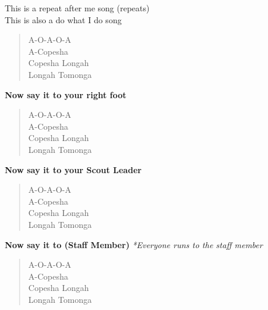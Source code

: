 
This is a repeat after me song (repeats) \\
This is also a do what I do song

\begin{verse}
A-O-A-O-A \\

A-Copesha \\

Copesha Longah \\

Longah Tomonga \\
\end{verse}

\textbf{Now say it to your right foot}

\begin{verse}
A-O-A-O-A \\

A-Copesha \\

Copesha Longah \\

Longah Tomonga \\
\end{verse}

\textbf{Now say it to your Scout Leader}

\begin{verse}
A-O-A-O-A \\

A-Copesha \\

Copesha Longah \\

Longah Tomonga \\
\end{verse}

\textbf{Now say it to (Staff Member)} \textit{*Everyone runs to the staff member}

\begin{verse}
A-O-A-O-A \\

A-Copesha \\

Copesha Longah \\
Longah Tomonga \\
\end{verse}

